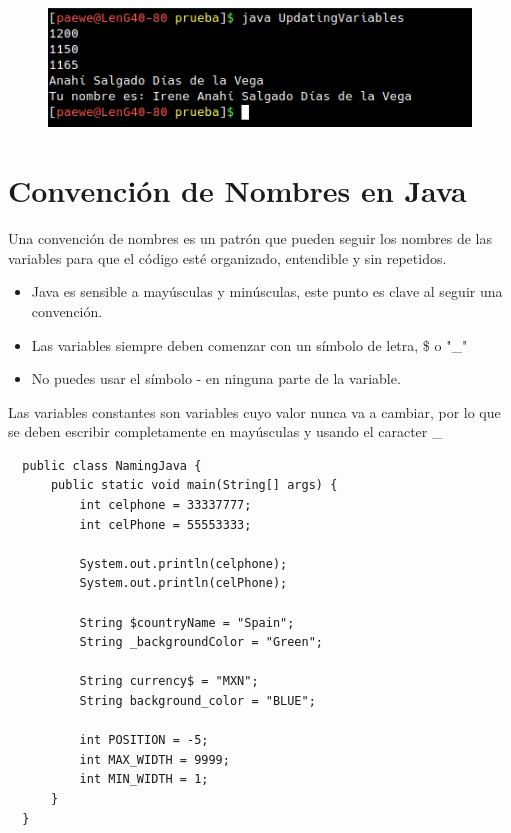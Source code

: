 \documentclass{article}
\begin{document}
\begin{figure}[h!]
  \centering
  \includegraphics[scale=0.75]{./Pictures/038_updating_variables.png}
\end{figure}


\section{Convención de Nombres en Java}%
Una convención de nombres es un patrón que pueden seguir los nombres de las
variables para que el código esté organizado, entendible y sin repetidos.\\

\begin{itemize}
  \item Java es sensible a mayúsculas y minúsculas, este punto es clave al
    seguir una convención.
  \item Las variables siempre deben comenzar con un símbolo de letra, \$ o "\_"
  \item No puedes usar el símbolo - en ninguna parte de la variable.
\end{itemize}

Las variables constantes son variables cuyo valor nunca va a cambiar, por lo
que se deben escribir completamente en mayúsculas y usando el caracter \_


\begin{verbatim}
  public class NamingJava {
      public static void main(String[] args) {
          int celphone = 33337777;
          int celPhone = 55553333;

          System.out.println(celphone);
          System.out.println(celPhone);

          String $countryName = "Spain";
          String _backgroundColor = "Green";

          String currency$ = "MXN";
          String background_color = "BLUE";

          int POSITION = -5;
          int MAX_WIDTH = 9999;
          int MIN_WIDTH = 1;
      }
  }
\end{verbatim}

\newpage
\end{document}
